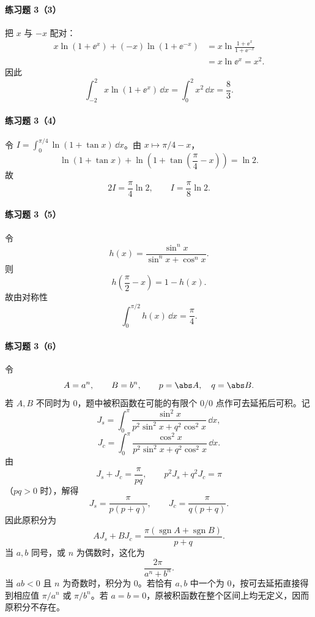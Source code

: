 \paragraph{练习题 3（3）}
\begin{xsolution}
把 $x$ 与 $-x$ 配对：
\begin{align*}
  x\ln(1+\ee^x)+(-x)\ln(1+\ee^{-x})
  &=x\ln\frac{1+\ee^x}{1+\ee^{-x}}\\
  &=x\ln\ee^x=x^2.
\end{align*}
因此
\[
  \int_{-2}^2x\ln(1+\ee^x)\,\dd x
  =\int_0^2x^2\,\dd x
  =\boxed{\frac83}.
\]
\end{xsolution}

\paragraph{练习题 3（4）}
\begin{xsolution}
令 $I=\int_0^{\pi/4}\ln(1+\tan x)\,\dd x$。由 $x\mapsto\pi/4-x$，
\[
  \ln(1+\tan x)+
  \ln\left(1+\tan\left(\frac\pi4-x\right)\right)=\ln2.
\]
故
\[
  2I=\frac\pi4\ln2,
  \qquad
  \boxed{I=\frac\pi8\ln2}.
\]
\end{xsolution}

\paragraph{练习题 3（5）}
\begin{xsolution}
令
\[
  h(x)=\frac{\sin^n x}{\sin^n x+\cos^n x}.
\]
则
\[
  h\left(\frac\pi2-x\right)=1-h(x).
\]
故由对称性
\[
  \boxed{\int_0^{\pi/2}h(x)\,\dd x=\frac\pi4}.
\]
\end{xsolution}

\paragraph{练习题 3（6）}
\begin{xsolution}
令
\[
  A=a^n,\qquad B=b^n,
  \qquad p=\abs A,\quad q=\abs B.
\]
若 $A,B$ 不同时为 $0$，题中被积函数在可能的有限个 $0/0$ 点作可去延拓后可积。记
\[
  J_s=\int_0^\pi\frac{\sin^2x}{p^2\sin^2x+q^2\cos^2x}\,\dd x,
\]
\[
  J_c=\int_0^\pi\frac{\cos^2x}{p^2\sin^2x+q^2\cos^2x}\,\dd x.
\]
由
\[
  J_s+J_c=\frac\pi{pq},
  \qquad
  p^2J_s+q^2J_c=\pi
\]
（$pq>0$ 时），解得
\[
  J_s=\frac\pi{p(p+q)},
  \qquad
  J_c=\frac\pi{q(p+q)}.
\]
因此原积分为
\[
  AJ_s+BJ_c
  =\boxed{\frac{\pi(\operatorname{sgn}A+\operatorname{sgn}B)}{p+q}}.
\]
当 $a,b$ 同号，或 $n$ 为偶数时，这化为
\[
  \boxed{\frac{2\pi}{a^n+b^n}}.
\]
当 $ab<0$ 且 $n$ 为奇数时，积分为 $0$。若恰有 $a,b$ 中一个为 $0$，按可去延拓直接得到相应值 $\pi/a^n$ 或 $\pi/b^n$。若 $a=b=0$，原被积函数在整个区间上均无定义，因而原积分不存在。
\end{xsolution}

